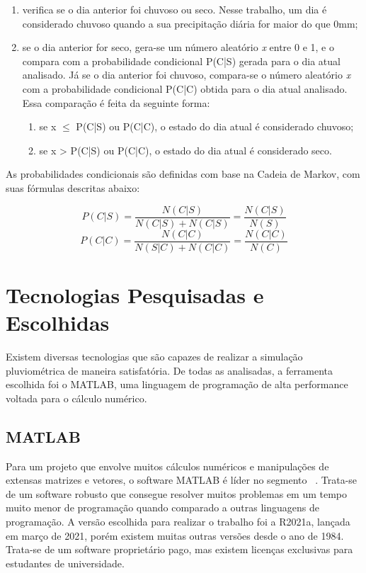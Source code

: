 \begin{enumerate}
  \item verifica se o dia anterior foi chuvoso ou seco. Nesse trabalho, um dia é considerado chuvoso quando a sua precipitação diária for maior do que 0mm;
  \item se o dia anterior for seco, gera-se um número aleatório \emph{x} entre 0 e 1, e o compara com a probabilidade condicional P(C|S) gerada para o dia atual analisado. Já se o dia anterior foi chuvoso, compara-se o número aleatório \emph{x} com a probabilidade condicional P(C|C) obtida para o dia atual analisado. Essa comparação é feita da seguinte forma:
  \begin{enumerate}[label=(\alph*)]
   \item se x $\leq$ P(C|S) ou P(C|C), o estado do dia atual é considerado chuvoso; 
   \item se x > P(C|S) ou P(C|C), o estado do dia atual é considerado seco.
  \end{enumerate}
\end{enumerate}

As probabilidades condicionais são definidas com base na Cadeia de Markov, com suas fórmulas descritas abaixo:

\[
    P(C|S)=\frac{N(C|S)}{N(C|S)+N(C|S)}=\frac{N(C|S)}{N(S)}
\]
\[
    P(C|C)=\frac{N(C|C)}{N(S|C)+N(C|C)}=\frac{N(C|C)}{N(C)}
\]

\section{Tecnologias Pesquisadas e Escolhidas}
\label{s.tecnologias}

Existem diversas tecnologias que são capazes de realizar a simulação pluviométrica de maneira satisfatória. De todas as analisadas, a ferramenta escolhida foi o MATLAB, uma linguagem de programação de alta performance voltada para o cálculo numérico.

\subsection{MATLAB}
\label{ss.matlab}

Para um projeto que envolve muitos cálculos numéricos e manipulações de extensas matrizes e vetores, o software MATLAB é líder no segmento ~\cite{matlab}. Trata-se de um software robusto que consegue resolver muitos problemas em um tempo muito menor de programação quando comparado a outras linguagens de programação.
A versão escolhida para realizar o trabalho foi a R2021a, lançada em março de 2021, 
porém existem muitas outras versões desde o ano de 1984.
Trata-se de um software proprietário pago, mas existem licenças exclusivas para estudantes de universidade.

